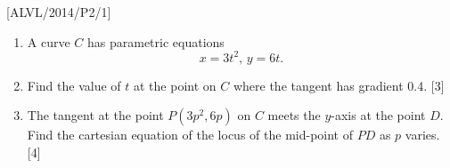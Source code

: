 \item {[}ALVL/2014/P2/1{]}
\begin{enumerate}
\item A curve $C$ has parametric equations 
\[
x=3t^{2},\,y=6t.
\]
 
\item Find the value of $t$ at the point on $C$ where the tangent has
gradient 0.4. \hfill{}{[}3{]}
\item The tangent at the point $P\left(3p^{2},6p\right)$ on $C$ meets
the $y$-axis at the point $D$. Find the cartesian equation of the
locus of the mid-point of $PD$ as $p$ varies.\hfill{} {[}4{]}
\end{enumerate}
